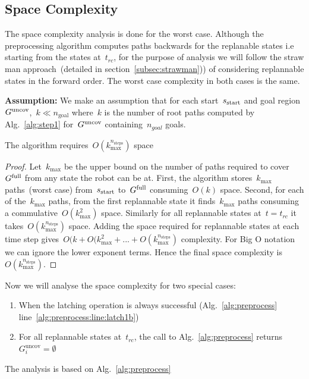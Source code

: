 \documentclass[a4paper]{report}
\begin{document}
\subsection{Space Complexity}
The space complexity analysis is done for the worst case. Although the preprocessing algorithm computes paths backwards for the replanable states i.e starting from the states at~$t_{rc}$, for the purpose of analysis we will follow the straw man approach~(detailed in section~\ref{subsec:strawman})) of considering replannable states in the forward order. The worst case complexity in both cases is the same.

\textbf{Assumption:}
We make an assumption that for each start~$s_{\textrm{start}}$ and goal region~$G^{\textrm{uncov}}$,~$k \ll n_{\text{goal}}$ where~$k$ is the number of root paths computed by Alg.~\ref{alg:step1} for~$G^{\textrm{uncov}}$ containing~$n_{goal}$ goals.


\vspace{2mm}
\begin{lemma}
	The algorithm requires~$O(k_{\text{max}}^{n_{\text{steps}}})$ space
\end{lemma}
\begin{proof}
Let~$k_{\text{max}}$ be the upper bound on the number of paths required to cover~$G^{\textrm{full}}$ from any state the robot can be at. First, the algorithm stores~$k_{\text{max}}$ paths~(worst case) from~$s_{\text{start}}$ to~$G^{\textrm{full}}$ consuming~$O(k)$ space. Second, for each of the~$k_{\text{max}}$ paths, from the first replannable state it finds~$k_{\text{max}}$ paths consuming a commulative~$O(k_{\text{max}}^2)$ space. Similarly for all replannable states at~$t=t_{rc}$ it takes~$O(k_{\text{max}}^{n_{\text{steps}}})$ space. Adding the space required for replannable states at each time step gives~$O(k + O(k_{\text{max}}^2 + ... +O(k_{\text{max}}^{n_{\text{steps}}})$ complexity. For Big O notation we can ignore the lower exponent terms. Hence the final space complexity is~$O(k_{\text{max}}^{n_{\text{steps}}})$.
\end{proof}

Now we will analyse the space complexity for two special cases:

\begin{enumerate}[label={\textbf{C\arabic*}},leftmargin=0.75cm]
\item \label{c1} When the latching operation is always successful (Alg.~\ref{alg:preprocess} line~\ref{alg:preprocess:line:latch1b})
\item \label{c2} For all replannable states at~$t_{rc}$, the call to Alg.~\ref{alg:preprocess} returns~$G_i^{\textrm{uncov}} = \emptyset$

\end{enumerate}
The analysis is based on Alg.~\ref{alg:preprocess}
\end{document}
